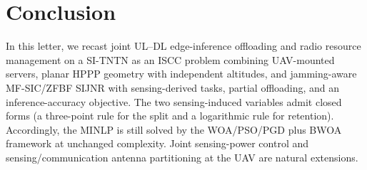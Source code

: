 \documentclass[journal]{IEEEtran}
\begin{document}
\section{Conclusion}
{\color{green!70!black}In this letter, we recast} joint UL--DL edge-inference offloading and radio resource management on a SI-TNTN as an ISCC problem combining UAV-mounted servers, planar HPPP geometry with independent altitudes, and jamming-aware MF-SIC/ZFBF SIJNR with sensing-derived tasks, partial offloading, and an inference-accuracy objective. The two sensing-induced variables admit closed forms (a three-point rule for the split and a logarithmic rule for retention).
Accordingly, the MINLP is still solved by the {WOA/PSO/PGD} plus BWOA framework at unchanged complexity. Joint sensing-power control and sensing/communication antenna partitioning at the UAV are natural extensions.



\end{document}
